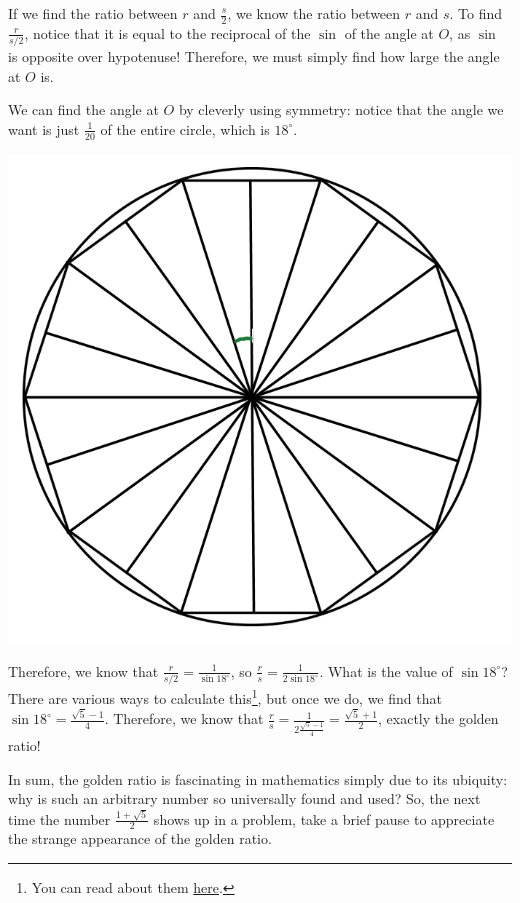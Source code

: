 \documentclass{article}
\begin{document}
If we find the ratio between $r$ and $\frac{s}{2}$, we know the ratio between $r$ and $s$. To find $\frac{r}{s/2}$, notice that it is equal to the reciprocal of the $\sin$ of the angle at $O$, as $\sin$ is opposite over hypotenuse! Therefore, we must simply find how large the angle at $O$ is.

We can find the angle at $O$ by cleverly using symmetry: notice that the angle we want is just $\frac1{20}$ of the entire circle, which is $18^\circ$.

\begin{center}
    \includegraphics[scale=0.25]{images/golden-ratio5.png}
\end{center}

Therefore, we know that $\frac{r}{s/2} = \frac1{\sin 18^\circ}$, so $\frac rs = \frac1{2\sin 18^\circ}$. What is the value of $\sin 18^\circ$? There are various ways to calculate this\footnote{You can read about them \href{https://math.stackexchange.com/questions/2140356/various-methods-to-find-value-of-sin-18-circ}{here}.}, but once we do, we find that $\sin 18^\circ = \frac{\sqrt5-1}4$. Therefore, we know that $\frac rs = \frac1{2\frac{\sqrt5-1}4} = \frac{\sqrt5+1}2$, exactly the golden ratio!

In sum, the golden ratio is fascinating in mathematics simply due to its ubiquity: why is such an arbitrary number so universally found and used? So, the next time the number $\frac{1+\sqrt5}2$ shows up in a problem, take a brief pause to appreciate the strange appearance of the golden ratio.
\end{document}

